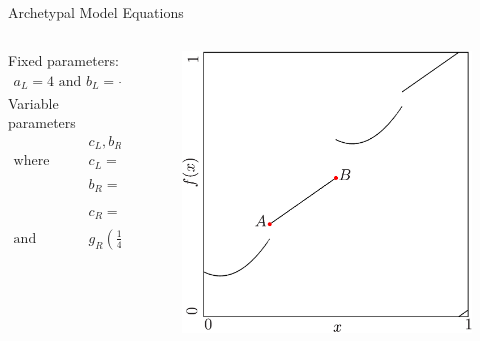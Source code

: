 \begin{frame}{Archetypal Model Equations}
    \vspace{-1em}
    \begin{columns}
        \begin{column}{.7 \textwidth}
            Fixed parameters:
            \begin{align*}
                a_L = 4 \text{ and } b_L = -\tfrac{1}{2}
            \end{align*}
            Variable parameters
            \begin{align*}
                    & c_L, b_R, c_R                                                                                                              \\
                \text{where} \qquad
                    & c_L = \beta,                                                                                                               \\
                    & b_R = -4 \cdot g_R\left(\tfrac{1}{4}\right) + 4 \cdot g_R\left(\tfrac{1}{2}\right),                                        \\
                    & c_R = 2 \cdot g_R\left(\tfrac{1}{4}\right) - 1 \cdot g_R\left(\tfrac{1}{2}\right),                                         \\[1em]
                \text{and} \qquad
                    & g_R\left(\tfrac{1}{4}\right) = \alpha, \text{and } g_R\left(\tfrac{1}{2}\right) = \tfrac{1}{2} + \epsilon \text{ is fixed}
            \end{align*}
        \end{column}
        \begin{column}{.3 \textwidth}
            \begin{figure}
                \centering
                \includegraphics[height=.5 \textheight]{Figs/archetypal_model_parameter_effects_illustration.png}

\end{figure}
\end{column}
\end{columns}
\end{frame}
